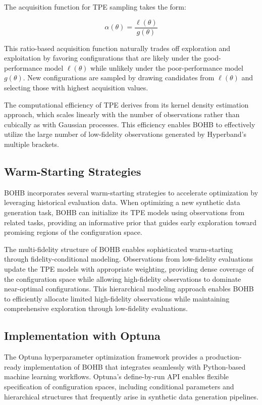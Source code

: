 The acquisition function for TPE sampling takes the form:

\begin{equation}
\alpha(\theta) = \frac{\ell(\theta)}{g(\theta)}
\label{eq:tpe_acquisition}
\end{equation}

This ratio-based acquisition function naturally trades off exploration and exploitation by favoring configurations that are likely under the good-performance model $\ell(\theta)$ while unlikely under the poor-performance model $g(\theta)$. New configurations are sampled by drawing candidates from $\ell(\theta)$ and selecting those with highest acquisition values.

The computational efficiency of TPE derives from its kernel density estimation approach, which scales linearly with the number of observations rather than cubically as with Gaussian processes. This efficiency enables BOHB to effectively utilize the large number of low-fidelity observations generated by Hyperband's multiple brackets.

\subsection{Warm-Starting Strategies}

BOHB incorporates several warm-starting strategies to accelerate optimization by leveraging historical evaluation data. When optimizing a new synthetic data generation task, BOHB can initialize its TPE models using observations from related tasks, providing an informative prior that guides early exploration toward promising regions of the configuration space.

The multi-fidelity structure of BOHB enables sophisticated warm-starting through fidelity-conditional modeling. Observations from low-fidelity evaluations update the TPE models with appropriate weighting, providing dense coverage of the configuration space while allowing high-fidelity observations to dominate near-optimal configurations. This hierarchical modeling approach enables BOHB to efficiently allocate limited high-fidelity observations while maintaining comprehensive exploration through low-fidelity evaluations.

\subsection{Implementation with Optuna}

The Optuna hyperparameter optimization framework provides a production-ready implementation of BOHB that integrates seamlessly with Python-based machine learning workflows. Optuna's define-by-run API enables flexible specification of configuration spaces, including conditional parameters and hierarchical structures that frequently arise in synthetic data generation pipelines.

